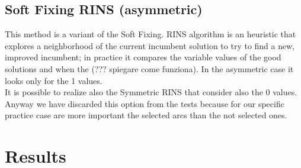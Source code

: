 \subsection{Soft Fixing RINS (asymmetric)}
This method is a variant of the Soft Fixing. RINS algorithm is an heuristic that explores a neighborhood of the current incumbent solution to try to find a new, improved incumbent; in practice it compares the variable values of the good solutions and when the (??? spiegare come funziona). In the asymmetric case it looks only for the 1 values. \\
It is possible to realize also the Symmetric RINS that consider also the $0$ values. Anyway we have discarded this option from the tests because for our specific practice case are more important the selected arcs than the not selected ones.
\section{Results}



